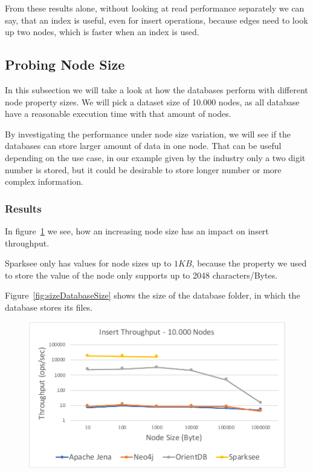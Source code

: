 From these results alone,
without looking at read performance separately we can say,
that an index is useful,
even for insert operations,
because edges need to look up two nodes,
which is faster when an index is used.

\subsection{Probing Node Size}
\label{ch:evaluation:se:probingNodeSize}
In this subsection we will take a look at how the databases perform with different node property sizes.
We will pick a dataset size of 10.000 nodes,
as all database have a reasonable execution time with that amount of nodes.

By investigating the performance under node size variation,
we will see if the databases can store larger amount of data in one node.
That can be useful depending on the use case,
in our example given by the industry only a two digit number is stored,
but it could be desirable to store longer number or more complex information.

\subsubsection{Results}
In figure~\ref{fig:nodeSize} we see,
how an increasing node size has an impact on insert throughput.

Sparksee only has values for node sizes up to $ 1KB $,
because the property we used to store the value of the node only supports up to 2048 characters/Bytes.

Figure~\ref{fig:sizeDatabaseSize} shows the size of the database folder,
in which the database stores its files.

\begin{figure}[h!]
  \centering
  \includegraphics[width=.75\textwidth]{images/throughput/nodeSize}
  \label{fig:nodeSize}
\end{figure}

